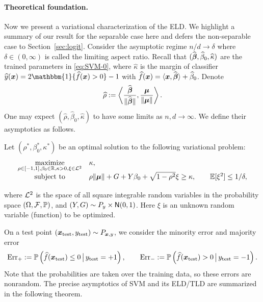 \paragraph{Theoretical foundation.} Now we present a variational characterization of the ELD. We highlight a summary of our result for the separable case here and defers the non-separable case to Section~\ref{sec:logit}.
Consider the asymptotic regime $n/d \to \delta$ where $\delta \in (0,\infty)$ is called the limiting aspect ratio. Recall that $(\hat\vbeta, \hat\beta_0, \hat\kappa)$ are the trained parameters in \cref{eq:SVM-0}, where $\hat\kappa$ is the margin of classifier $\hat{y} (\xx) = 2 \mathbbm{1}\{ \hat f(\vx) > 0\} - 1$ with $\hat f(\vx) = \langle \vx, \hat \vbeta \rangle + \hat \beta_0$. Denote 
\begin{equation}\label{eq:rho_hat}
\hat \rho := 
\biggl\< \frac{\hat \vbeta}{\| \hat \vbeta \|}, \frac{\vmu}{\| \vmu \|} \biggr\>\,.
\end{equation}
One may expect $(\hat\rho, \hat\beta_0, \hat\kappa)$ to have some limits as $n,d \to \infty$. We define their asymptotics as follows.

\begin{defn}
    Let $(\rho^*, \beta_0^*, \kappa^*)$ be an optimal solution to the following variational problem:
			\begin{equation}
                \label{eq:asymp}
				\begin{array}{cl}
					\underset{ \rho \in [-1, 1], \beta_0 \in \R, \kappa > 0 , \xi \in \cL^2  }{ \mathrm{maximize} } & \kappa, \\
					\underset{ \phantom{\smash{\bm\beta \in \R^d, \beta_0 \in \R, \kappa \in \R} } }{\text{subject to}} &  \rho \| \bmu\| + G + Y \beta_0 + \sqrt{1 - \rho^2} \xi \ge \kappa,  
					\qquad \E[\xi^2]  \le  1/\delta,
					\end{array}
			\end{equation}
    where $\cL^2$ is the space of all square integrable random variables in the probability space $(\Omega, \mathcal{F}, \P)$, and $(Y, G) \sim P_y \times \normal(0, 1)$. Here $\xi$ is an unknown random variable (function) to be optimized.
\end{defn}
On a test point $(\vx_\mathrm{test}, y_\mathrm{test}) \sim P_{\vx,y}$, we consider the minority error and majority error
\begin{equation}\label{eq:Err_n}
    \Err_+ := \P\left( \hat f(\xx_\mathrm{test}) \le 0 \,\big|\, y_\mathrm{test} = +1 \right),
    \qquad
    \Err_- := \P\left( \hat f(\xx_\mathrm{test}) > 0 \,\big|\, y_\mathrm{test} = -1 \right).
\end{equation}
Note that the probabilities are taken over the training data, so these errors are nonrandom. The precise asymptotics of SVM and its ELD/TLD are summarized in the following theorem.

